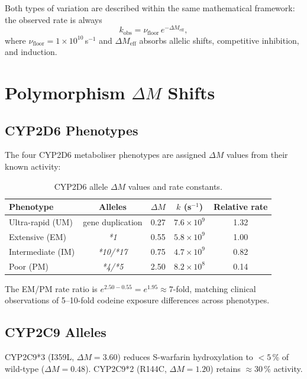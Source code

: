 \documentclass[11pt,twocolumn,a4paper]{article}
\begin{document}
Both types of variation are described within the same mathematical
framework: the observed rate is always
\begin{equation}
  k_\text{obs} = \nu_\text{floor}\,e^{-\Delta M_\text{eff}},
\end{equation}
where $\nu_\text{floor} = 1\times10^{10}$\,s$^{-1}$ and $\Delta M_\text{eff}$
absorbs allelic shifts, competitive inhibition, and induction.

\section{Polymorphism $\Delta M$ Shifts}

\subsection{CYP2D6 Phenotypes}

The four CYP2D6 metaboliser phenotypes are assigned $\Delta M$ values
from their known activity:

\begin{table}[h]
\centering
\caption{CYP2D6 allele $\Delta M$ values and rate constants.}
\begin{tabular}{lcccc}
\toprule
Phenotype & Alleles & $\Delta M$ & $k$ (s$^{-1}$) & Relative rate \\
\midrule
Ultra-rapid (UM) & gene duplication & 0.27 & $7.6\times10^9$ & 1.32 \\
Extensive (EM)   & \textit{*1}      & 0.55 & $5.8\times10^9$ & 1.00 \\
Intermediate (IM)& \textit{*10/*17} & 0.75 & $4.7\times10^9$ & 0.82 \\
Poor (PM)        & \textit{*4/*5}   & 2.50 & $8.2\times10^8$ & 0.14 \\
\bottomrule
\end{tabular}
\end{table}

The EM/PM rate ratio is $e^{2.50 - 0.55} = e^{1.95} \approx 7$-fold,
matching clinical observations of 5--10-fold codeine exposure differences
across phenotypes.

\subsection{CYP2C9 Alleles}

CYP2C9*3 (I359L, $\Delta M = 3.60$) reduces S-warfarin hydroxylation to
$< 5$\,\% of wild-type ($\Delta M = 0.48$).  CYP2C9*2 (R144C,
$\Delta M = 1.20$) retains $\approx 30$\,\% activity.
\end{document}
